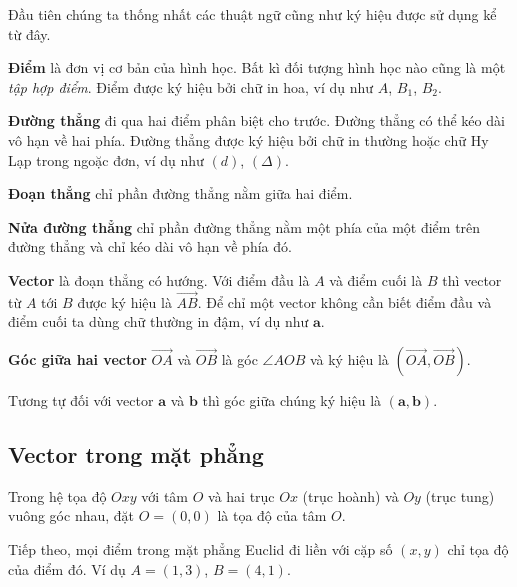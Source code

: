 Đầu tiên chúng ta thống nhất các thuật ngữ cũng như ký hiệu được sử dụng kể từ đây.

\textbf{Điểm} là đơn vị cơ bản của hình học. Bất kì đối tượng hình học nào cũng là một \textit{tập hợp điểm}. Điểm được ký hiệu bởi chữ in hoa, ví dụ như $A$, $B_1$, $B_2$.

\textbf{Đường thẳng} đi qua hai điểm phân biệt cho trước. Đường thẳng có thể kéo dài vô hạn về hai phía. Đường thẳng được ký hiệu bởi chữ in thường hoặc chữ Hy Lạp trong ngoặc đơn, ví dụ như $(d)$, $(\Delta)$.

\textbf{Đoạn thẳng} chỉ phần đường thẳng nằm giữa hai điểm.

\textbf{Nửa đường thẳng} chỉ phần đường thẳng nằm một phía của một điểm trên đường thẳng và chỉ kéo dài vô hạn về phía đó.

\textbf{Vector} là đoạn thẳng có hướng. Với điểm đầu là $A$ và điểm cuối là $B$ thì vector từ $A$ tới $B$ được ký hiệu là $\overrightarrow{AB}$. Để chỉ một vector không cần biết điểm đầu và điểm cuối ta dùng chữ thường in đậm, ví dụ như $\bm{a}$.

\textbf{Góc giữa hai vector} $\overrightarrow{OA}$ và $\overrightarrow{OB}$ là góc $\angle AOB$ và ký hiệu là $(\overrightarrow{OA}, \overrightarrow{OB})$.

Tương tự đối với vector $\bm{a}$ và $\bm{b}$ thì góc giữa chúng ký hiệu là $(\bm{a}, \bm{b})$.

\subsection*{Vector trong mặt phẳng}

Trong hệ tọa độ $Oxy$ với tâm $O$ và hai trục $Ox$ (trục hoành) và $Oy$ (trục tung) vuông góc nhau, đặt $O = (0, 0)$ là tọa độ của tâm $O$.

Tiếp theo, mọi điểm trong mặt phẳng Euclid đi liền với cặp số $(x, y)$ chỉ tọa độ của điểm đó. Ví dụ $A = (1, 3)$, $B = (4, 1)$.

